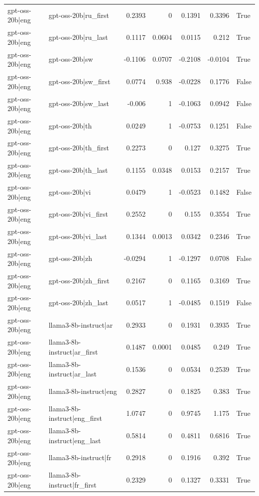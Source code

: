 \begin{table}
\begin{tabular}{l l r r r r l}
gpt-oss-20b|eng & gpt-oss-20b|ru_first & 0.2393 & 0 & 0.1391 & 0.3396 & True \\
gpt-oss-20b|eng & gpt-oss-20b|ru_last & 0.1117 & 0.0604 & 0.0115 & 0.212 & True \\
gpt-oss-20b|eng & gpt-oss-20b|sw & -0.1106 & 0.0707 & -0.2108 & -0.0104 & True \\
gpt-oss-20b|eng & gpt-oss-20b|sw_first & 0.0774 & 0.938 & -0.0228 & 0.1776 & False \\
gpt-oss-20b|eng & gpt-oss-20b|sw_last & -0.006 & 1 & -0.1063 & 0.0942 & False \\
gpt-oss-20b|eng & gpt-oss-20b|th & 0.0249 & 1 & -0.0753 & 0.1251 & False \\
gpt-oss-20b|eng & gpt-oss-20b|th_first & 0.2273 & 0 & 0.127 & 0.3275 & True \\
gpt-oss-20b|eng & gpt-oss-20b|th_last & 0.1155 & 0.0348 & 0.0153 & 0.2157 & True \\
gpt-oss-20b|eng & gpt-oss-20b|vi & 0.0479 & 1 & -0.0523 & 0.1482 & False \\
gpt-oss-20b|eng & gpt-oss-20b|vi_first & 0.2552 & 0 & 0.155 & 0.3554 & True \\
gpt-oss-20b|eng & gpt-oss-20b|vi_last & 0.1344 & 0.0013 & 0.0342 & 0.2346 & True \\
gpt-oss-20b|eng & gpt-oss-20b|zh & -0.0294 & 1 & -0.1297 & 0.0708 & False \\
gpt-oss-20b|eng & gpt-oss-20b|zh_first & 0.2167 & 0 & 0.1165 & 0.3169 & True \\
gpt-oss-20b|eng & gpt-oss-20b|zh_last & 0.0517 & 1 & -0.0485 & 0.1519 & False \\
gpt-oss-20b|eng & llama3-8b-instruct|ar & 0.2933 & 0 & 0.1931 & 0.3935 & True \\
gpt-oss-20b|eng & llama3-8b-instruct|ar_first & 0.1487 & 0.0001 & 0.0485 & 0.249 & True \\
gpt-oss-20b|eng & llama3-8b-instruct|ar_last & 0.1536 & 0 & 0.0534 & 0.2539 & True \\
gpt-oss-20b|eng & llama3-8b-instruct|eng & 0.2827 & 0 & 0.1825 & 0.383 & True \\
gpt-oss-20b|eng & llama3-8b-instruct|eng_first & 1.0747 & 0 & 0.9745 & 1.175 & True \\
gpt-oss-20b|eng & llama3-8b-instruct|eng_last & 0.5814 & 0 & 0.4811 & 0.6816 & True \\
gpt-oss-20b|eng & llama3-8b-instruct|fr & 0.2918 & 0 & 0.1916 & 0.392 & True \\
gpt-oss-20b|eng & llama3-8b-instruct|fr_first & 0.2329 & 0 & 0.1327 & 0.3331 & True \\

\end{tabular}
\end{table}
